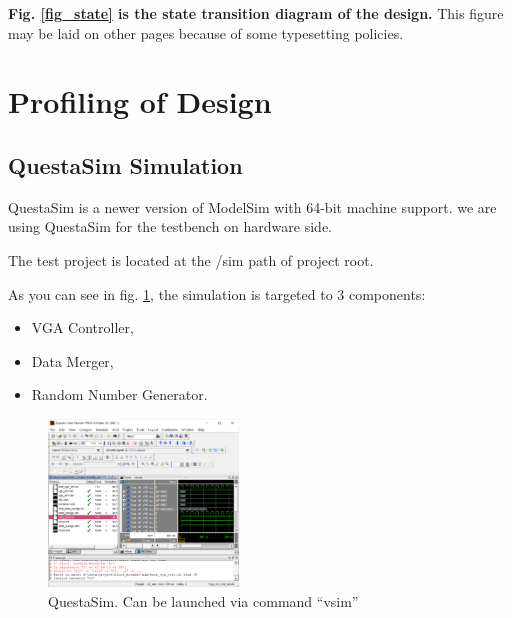 \documentclass[conference]{IEEEtran}
\begin{document}
\textbf{Fig. \ref{fig_state} is the state transition diagram of the design.} This figure may be laid on other pages because of some typesetting policies.


\section{Profiling of Design}

\subsection{QuestaSim Simulation}
QuestaSim is a newer version of ModelSim with 64-bit machine support.  we are using QuestaSim for the testbench on hardware side.

The test project is located at the /sim path of project root.

As you can see in fig. \ref{fig_sim0}, the simulation is targeted to 3 components: 
\begin{itemize}
    \item VGA Controller,
    \item Data Merger,
    \item Random Number Generator.
\end{itemize}

\begin{figure}[h] %
    \centering
    \includegraphics[width=0.45\textwidth]{imageset/sim0}
    \caption{QuestaSim. Can be launched via command ``vsim''}
    \label{fig_sim0}
\end{figure}
\end{document}
